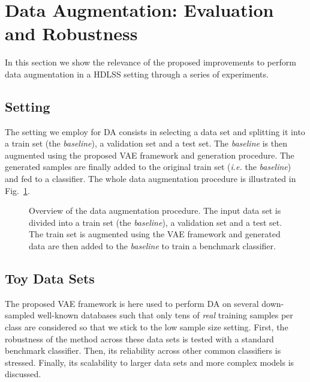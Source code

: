 \documentclass[10pt,journal,compsoc]{IEEEtran}
\begin{document}
\section{Data Augmentation: Evaluation and Robustness}\label{Sec: Data Augmentation}

In this section we show the relevance of the proposed improvements to perform data augmentation in a HDLSS setting through a series of experiments.

\subsection{Setting}
The setting we employ for DA consists in selecting a data set and splitting it into a train set (the \emph{baseline}), a validation set and a test set. The \emph{baseline} is then augmented using the proposed VAE framework and generation procedure. The generated samples are finally added to the original train set (\emph{i.e.} the \emph{baseline}) and fed to a classifier. The whole data augmentation procedure is illustrated in Fig.~\ref{Fig: DA framework}.

\begin{figure}[!ht]
  \centering
  \caption{Overview of the data augmentation procedure. The input data set is divided into a train set (the \emph{baseline}), a validation set and a test set. The train set is augmented using the VAE framework and generated data are then added to the \emph{baseline} to train a benchmark classifier.}
  \label{Fig: DA framework}
  \end{figure}
  
\subsection{Toy Data Sets}
The proposed VAE framework is here used to perform DA on several down-sampled well-known databases such that only tens of \emph{real} training samples per class are considered so that we stick to the low sample size setting. First, the robustness of the method across these data sets is tested with a standard benchmark classifier. Then, its reliability across other common classifiers is stressed. Finally, its scalability to larger data sets and more complex models is discussed.
\end{document}
